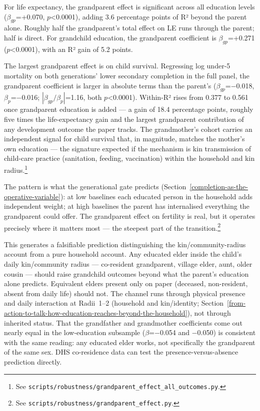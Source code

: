 \documentclass[12pt,letterpaper]{article}
\begin{document}
For life expectancy, the grandparent effect is significant across all
education levels ($\beta_{gp}$=+0.070, $p$\textless0.0001), adding 3.6
percentage points of R² beyond the parent alone. Roughly half the
grandparent's total effect on LE runs through the parent; half is
direct. For grandchild education, the grandparent coefficient is
$\beta_{gp}$=+0.271 ($p$\textless0.0001), with an R² gain of 5.2 points.

The largest grandparent effect is on child survival. Regressing log
under-5 mortality on both generations' lower secondary completion in
the full panel, the grandparent coefficient is larger in absolute
terms than the parent's ($\beta_{gp}$=$-$0.018, $\beta_p$=$-$0.016;
$|\beta_{gp}/\beta_p|$=1.16, both $p$\textless0.0001). Within-R² rises
from 0.377 to 0.561 once grandparent education is added --- a gain of
18.4 percentage points, roughly five times the life-expectancy gain
and the largest grandparent contribution of any development outcome
the paper tracks. The grandmother's cohort carries an independent
signal for child survival that, in magnitude, matches the mother's
own education --- the signature expected if the mechanism is kin
transmission of child-care practice (sanitation, feeding,
vaccination) within the household and kin radius.\footnote{See
\texttt{scripts/robustness/grandparent\_effect\_all\_outcomes.py}.}

The pattern is what the generational gate predicts
(Section~\ref{completion-as-the-operative-variable}): at low baselines
each educated person in the household adds independent weight; at high
baselines the parent has internalised everything the grandparent could
offer. The grandparent effect on fertility is real, but it operates
precisely where it matters most --- the steepest part of the
transition.\footnote{See
\texttt{scripts/robustness/grandparent\_effect.py}.}

This generates a falsifiable prediction distinguishing the
kin/community-radius account from a pure household account. Any educated elder inside
the child's daily kin/community radius --- co-resident grandparent,
village elder, aunt, older cousin --- should raise grandchild outcomes
beyond what the parent's education alone predicts. Equivalent
elders present only on paper (deceased, non-resident, absent from daily
life) should not. The channel runs through physical presence and daily
interaction at Radii~1--2 (household and kin/identity;
Section~\ref{from-action-to-talk-how-education-reaches-beyond-the-household}),
not through inherited status. That the grandfather and grandmother
coefficients come out nearly equal in the low-education subsample
($\beta$=$-$0.054 and $-$0.050) is consistent with the same reading: any
educated elder works, not specifically the grandparent of the same
sex. DHS co-residence data can test the presence-versus-absence
prediction directly.
\end{document}
